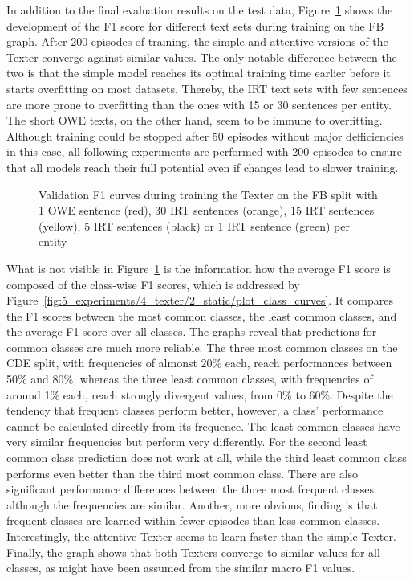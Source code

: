 In addition to the final evaluation results on the test data, Figure~\ref{fig:5_experiments/4_texter/2_static/plot_valid_curves} shows the development of the F1 score for different text sets during training on the FB graph. After 200 episodes of training, the simple and attentive versions of the Texter converge against similar values. The only notable difference between the two is that the simple model reaches its optimal training time earlier before it starts overfitting on most datasets. Thereby, the IRT text sets with few sentences are more prone to overfitting than the ones with 15 or 30 sentences per entity. The short OWE texts, on the other hand, seem to be immune to overfitting. Although training could be stopped after 50 episodes without major defficiencies in this case, all following experiments are performed with 200 episodes to ensure that all models reach their full potential even if changes lead to slower training.

\begin{figure}[t]
    \centering
    
    \caption{Validation F1 curves during training the Texter on the FB split with 1 OWE sentence (red), 30 IRT sentences (orange), 15 IRT sentences (yellow), 5 IRT sentences (black) or 1 IRT sentence (green) per entity}
    \label{fig:5_experiments/4_texter/2_static/plot_valid_curves}
\end{figure}

What is not visible in Figure~\ref{fig:5_experiments/4_texter/2_static/plot_valid_curves} is the information how the average F1 score is composed of the class-wise F1 scores, which is addressed by Figure~\ref{fig:5_experiments/4_texter/2_static/plot_class_curves}. It compares the F1 scores between the most common classes, the least common classes, and the average F1 score over all classes. The graphs reveal that predictions for common classes are much more reliable. The three most common classes on the CDE split, with frequencies of almonst 20\% each, reach performances between 50\% and 80\%, whereas the three least common classes, with frequencies of around 1\% each, reach strongly divergent values, from 0\% to 60\%. Despite the tendency that frequent classes perform better, however, a class' performance cannot be calculated directly from its frequence. The least common classes have very similar frequencies but perform very differently. For the second least common class prediction does not work at all, while the third least common class performs even better than the third most common class. There are also significant performance differences between the three most frequent classes although the frequencies are similar. Another, more obvious, finding is that frequent classes are learned within fewer episodes than less common classes. Interestingly, the attentive Texter seems to learn faster than the simple Texter. Finally, the graph shows that both Texters converge to similar values for all classes, as might have been assumed from the similar macro F1 values.

